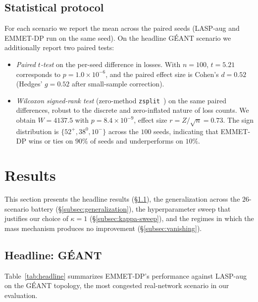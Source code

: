 \subsection{Statistical protocol}
\label{subsec:statistics}

For each scenario we report the mean across the paired seeds
(LASP-aug and EMMET-DP run on the same seed). On the headline
GÉANT scenario we additionally report two paired tests:

\begin{itemize}
\item \emph{Paired $t$-test} on the per-seed difference in losses.
With $n=100$, $t=5.21$ corresponds to $p = 1.0\times 10^{-6}$,
and the paired effect size is Cohen's $d = 0.52$
(Hedges' $g = 0.52$ after small-sample correction).
\item \emph{Wilcoxon signed-rank test} (zero-method
\texttt{zsplit}~\cite{pratt1959zero}) on the same paired
differences, robust to the discrete and zero-inflated nature of
loss counts. We obtain $W=4137.5$ with $p=8.4\times10^{-9}$, effect size
$r = Z/\sqrt{n} = 0.73$.
The sign distribution is $\{52^+, 38^0, 10^-\}$ across the $100$
seeds, indicating that EMMET-DP wins or ties on $90\%$ of seeds
and underperforms on $10\%$.
\end{itemize}


\section{Results}
\label{sec:results}

This section presents the headline results
(\S\ref{subsec:headline}), the generalization across the
$26$-scenario battery (\S\ref{subsec:generalization}), the
hyperparameter sweep that justifies our choice of $\kappa = 1$
(\S\ref{subsec:kappa-sweep}), and the regimes in which the mass
mechanism produces no improvement
(\S\ref{subsec:vanishing}).

\subsection{Headline: GÉANT}
\label{subsec:headline}

Table~\ref{tab:headline} summarizes EMMET-DP's performance against
LASP-aug on the GÉANT topology, the most congested real-network
scenario in our evaluation.

